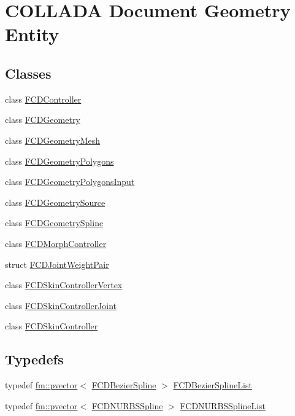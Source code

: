 \hypertarget{group__FCDGeometry}{
\section{COLLADA Document Geometry Entity}
\label{group__FCDGeometry}
}
\subsection*{Classes}
\begin{DoxyCompactItemize}
\item 
class \hyperlink{classFCDController}{FCDController}
\item 
class \hyperlink{classFCDGeometry}{FCDGeometry}
\item 
class \hyperlink{classFCDGeometryMesh}{FCDGeometryMesh}
\item 
class \hyperlink{classFCDGeometryPolygons}{FCDGeometryPolygons}
\item 
class \hyperlink{classFCDGeometryPolygonsInput}{FCDGeometryPolygonsInput}
\item 
class \hyperlink{classFCDGeometrySource}{FCDGeometrySource}
\item 
class \hyperlink{classFCDGeometrySpline}{FCDGeometrySpline}
\item 
class \hyperlink{classFCDMorphController}{FCDMorphController}
\item 
struct \hyperlink{structFCDJointWeightPair}{FCDJointWeightPair}
\item 
class \hyperlink{classFCDSkinControllerVertex}{FCDSkinControllerVertex}
\item 
class \hyperlink{classFCDSkinControllerJoint}{FCDSkinControllerJoint}
\item 
class \hyperlink{classFCDSkinController}{FCDSkinController}
\end{DoxyCompactItemize}
\subsection*{Typedefs}
\begin{DoxyCompactItemize}
\item 
typedef \hyperlink{classfm_1_1pvector}{fm::pvector}$<$ \hyperlink{classFCDBezierSpline}{FCDBezierSpline} $>$ \hyperlink{group__FCDGeometry_ga682b3a25e3a6897d53ed4ecfca38cc02}{FCDBezierSplineList}
\item 
typedef \hyperlink{classfm_1_1pvector}{fm::pvector}$<$ \hyperlink{classFCDNURBSSpline}{FCDNURBSSpline} $>$ \hyperlink{group__FCDGeometry_ga3a3cbf3258acc2e38013b0393f0fedc8}{FCDNURBSSplineList}
\end{DoxyCompactItemize}


